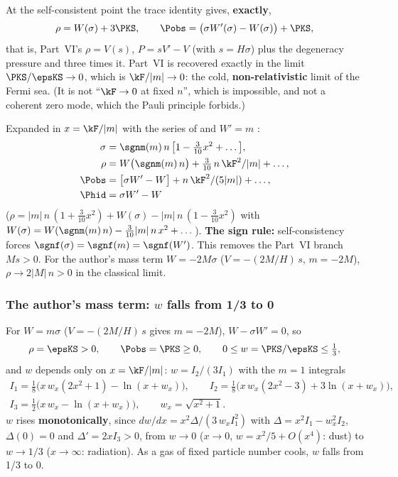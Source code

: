 At the self-consistent point the trace identity gives, \textbf{exactly},
\[
  \rho=W(\sigma)+3\PKS,\qquad \Pobs=\bigl(\sigma W'(\sigma)-W(\sigma)\bigr)+\PKS ,
\]
that is, Part~VI's $\rho=V(s)$, $P=sV'-V$ (with $s=H\sigma$) plus the degeneracy pressure and three
times it. Part~VI is recovered exactly in the limit $\PKS/\epsKS\to0$, which is $\kF/|m|\to0$: the
cold, \textbf{non-relativistic} limit of the Fermi sea. (It is not ``$\kF\to0$ at fixed $n$'', which
is impossible, and not a coherent zero mode, which the Pauli principle forbids.) 

Expanded in $x=\kF/|m|$ with the series of  and $W'=m$ \cfderived:
\begin{align*}
  \sigma&=\sgnm(m)\,n\,\bigl[1-\tfrac{3}{10}x^2+\dots\bigr],\\
  \rho&=W\bigl(\sgnm(m)\,n\bigr)+\tfrac{3}{10}\,n\,\kF^2/|m|+\dots,\\
  \Pobs&=\bigl[\sigma W'-W\bigr]+n\,\kF^2/(5|m|)+\dots,\\
  \Phid&=\sigma W'-W
\end{align*}
($\rho=|m|\,n\,(1+\frac{3}{10}x^2)+W(\sigma)-|m|\,n\,(1-\frac{3}{10}x^2)$ with
$W(\sigma)=W(\sgnm(m)\,n)-\frac{3}{10}|m|\,n\,x^2+\dots$). \textbf{The sign rule:} self-consistency
forces $\sgnf(\sigma)=\sgnf(m)=\sgnf(W')$. This removes the Part~VI branch $Ms>0$. For the author's
mass term $W=-2M\sigma$ ($V=-(2M/H)\,s$, $m=-2M$), $\rho\to2|M|\,n>0$ in the classical limit.

\subsubsection{The author's mass term: \texorpdfstring{$w$}{w} falls from 1/3 to 0}
\label{sec:3.7.8}

For $W=m\sigma$ ($V=-(2M/H)\,s$ gives $m=-2M$), $W-\sigma W'=0$, so
\[
  \rho=\epsKS>0,\qquad \Pobs=\PKS\geq0,\qquad 0\leq w=\PKS/\epsKS\leq\tfrac13 ,
\]
and $w$ depends only on $x=\kF/|m|$: $w=I_2/(3I_1)$ with the $m=1$ integrals
\begin{gather*}
  I_1=\tfrac18\bigl(x\,w_x(2x^2+1)-\ln(x+w_x)\bigr),\qquad
  I_2=\tfrac18\bigl(x\,w_x(2x^2-3)+3\ln(x+w_x)\bigr),\\
  I_3=\tfrac12\bigl(x\,w_x-\ln(x+w_x)\bigr),\qquad w_x=\sqrt{x^2+1}.
\end{gather*}
$w$ rises \textbf{monotonically}, since $dw/dx=x^2\Delta/(3\,w_x I_1^2)$ with
$\Delta=x^2I_1-w_x^2I_2$, $\Delta(0)=0$ and $\Delta'=2xI_3>0$, from $w\to0$ ($x\to0$,
$w=x^2/5+O(x^4)$: dust) to $w\to1/3$ ($x\to\infty$: radiation). As a gas of fixed particle number
cools, $w$ falls from 1/3 to 0.

